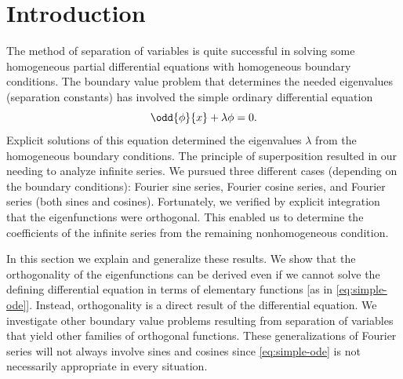 \section{Introduction}
\label{sec:sl-intro}

The method of separation of variables is quite successful in solving some homogeneous partial differential equations with homogeneous boundary conditions.  The boundary value problem that determines the needed eigenvalues (separation constants) has involved the simple ordinary differential equation
\begin{equation}
\label{eq:simple-ode}
\odd{\phi}{x} + \lambda\phi = 0.
\end{equation}
Explicit solutions of this equation determined the eigenvalues $\lambda$ from the homogeneous boundary conditions.  The principle of superposition resulted in our needing to analyze infinite series.  We pursued three different cases (depending on the boundary conditions): Fourier sine series, Fourier cosine series, and Fourier series (both sines and cosines).  Fortunately, we verified by explicit integration that the eigenfunctions were orthogonal.  This enabled us to determine the coefficients of the infinite series from the remaining nonhomogeneous condition.

In this section we explain and generalize these results.  We show that the orthogonality of the eigenfunctions can be derived even if we cannot solve the defining differential equation in terms of elementary functions [as in \eqref{eq:simple-ode}].  Instead, orthogonality is a direct result of the differential equation.  We investigate other boundary value problems resulting from separation of variables that yield other families of orthogonal functions.  These generalizations of Fourier series will not always involve sines and cosines since \eqref{eq:simple-ode} is not necessarily appropriate in every situation.
